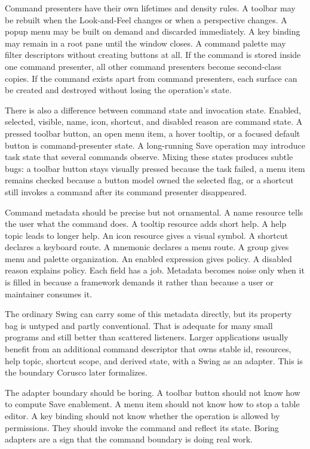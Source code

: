 Command presenters have their own lifetimes and density rules. A toolbar may be rebuilt
when the Look-and-Feel changes or when a perspective changes. A popup menu may
be built on demand and discarded immediately. A key binding may remain in a
root pane until the window closes. A command palette may filter descriptors
without creating buttons at all. If the command is stored inside one command presenter,
all other command presenters become second-class copies. If the command exists apart
from command presenters, each surface can be created and destroyed without losing the
operation's state.

There is also a difference between command state and invocation state. Enabled,
selected, visible, name, icon, shortcut, and disabled reason are command state.
A pressed toolbar button, an open menu item, a hover tooltip, or a focused
default button is command-presenter state. A long-running Save operation may introduce
task state that several commands observe. Mixing these states produces subtle
bugs: a toolbar button stays visually pressed because the task failed, a menu
item remains checked because a button model owned the selected flag, or a
shortcut still invokes a command after its command presenter disappeared.

Command metadata should be precise but not ornamental. A name resource tells
the user what the command does. A tooltip resource adds short help. A help topic
leads to longer help. An icon resource gives a visual symbol. A shortcut
declares a keyboard route. A mnemonic declares a menu route. A group gives menu
and palette organization. An enabled expression gives policy. A disabled reason
explains policy. Each field has a job. Metadata becomes noise only when it is
filled in because a framework demands it rather than because a user or
maintainer consumes it.

The ordinary Swing  can carry some of this metadata directly, but
its property bag is untyped and partly conventional. That is adequate for many
small programs and still better than scattered listeners. Larger applications
usually benefit from an additional command descriptor that owns stable id,
resources, help topic, shortcut scope, and derived state, with a Swing
 as an adapter. This is the boundary Corusco later formalizes.

The adapter boundary should be boring. A toolbar button should not know how to
compute Save enablement. A menu item should not know how to stop a table editor.
A key binding should not know whether the operation is allowed by permissions.
They should invoke the command and reflect its state. Boring adapters are a
sign that the command boundary is doing real work.

